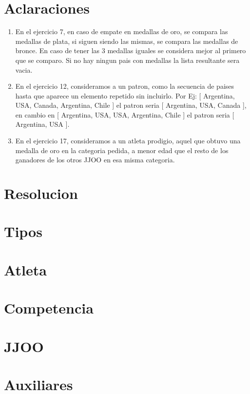 \documentclass[10pt,titlepage,a4paper]{article}
\begin{document}
\maketitle

\newpage

\section{Aclaraciones}

\begin{enumerate}
\item
En el ejercicio 7, en caso de empate en medallas de oro, se compara las medallas de plata, si siguen siendo las mismas, se compara las medallas de bronce. En caso de tener las 3 medallas iguales se considera mejor al primero que se comparo.
Si no hay ningun pais con medallas la lista resultante sera vacia.

\item
En el ejercicio 12, consideramos a un patron, como la secuencia de paises hasta que aparece un elemento repetido sin incluirlo. Por Ej: [ Argentina, USA, Canada, Argentina, Chile ] el patron seria [ Argentina, USA, Canada ], en cambio en [ Argentina, USA, USA, Argentina, Chile ] el patron seria [ Argentina, USA ].

\item
En el ejercicio 17, consideramos a un atleta prodigio, aquel que obtuvo una medalla de oro en la categoria pedida, a menor edad que el resto de los ganadores de los otros JJOO en esa misma categoria.
\end{enumerate}

\section{Resolucion}

\begin{enumerate}






\end{enumerate}

\newpage

\section{Tipos}



\section{Atleta}


\section{Competencia}



\section{JJOO}


\section{Auxiliares}


\end{document}
